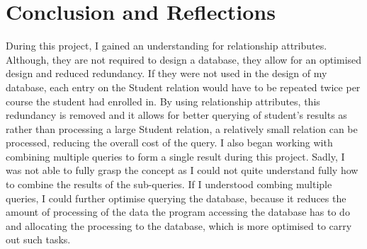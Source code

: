 \documentclass[12pt]{article}
\begin{document}
\section{Conclusion and Reflections}
During this project, I gained an understanding for relationship attributes.
Although, they are not required to design a database, they allow for an optimised design and reduced redundancy.
If they were not used in the design of my database, each entry on the Student relation would have to be repeated twice per course the student had enrolled in.
By using relationship attributes, this redundancy is removed and it allows for better querying of student's results as rather than processing a large Student relation, a relatively small relation can be processed, reducing the overall cost of the query.
I also began working with combining multiple queries to form a single result during this project.
Sadly, I was not able to fully grasp the concept as I could not quite understand fully how to combine the results of the sub-queries.
If I understood combing multiple queries, I could further optimise querying the database, because it reduces the amount of processing of the data the program accessing the database has to do and allocating the processing to the database, which is more optimised to carry out such tasks.
\end{document}
